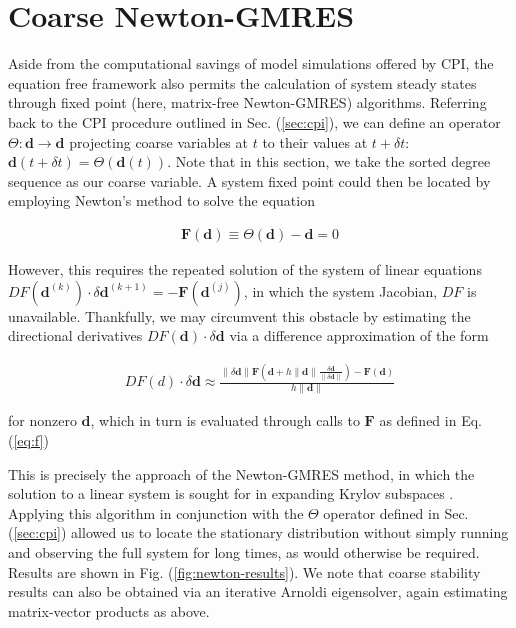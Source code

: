   \section{Coarse Newton-GMRES}
  \label{sec:ng}
  Aside from the computational savings of model simulations offered by
  CPI, the equation free framework also permits the calculation of
  system steady states through fixed point (here, matrix-free
  Newton-GMRES) algorithms.
  Referring back to the CPI procedure outlined in
  Sec. (\ref{sec:cpi}), we can define an operator
  $\Theta: \mathbf{d} \rightarrow \mathbf{d}$ projecting coarse
  variables at $t$ to their values at $t + \delta t$:
  $\mathbf{d}(t+\delta t) =\Theta(\mathbf{d}(t))$.
  Note that in this section, we take the sorted degree sequence as our
  coarse variable.
  A system fixed point could then be located by employing Newton's
  method to solve the equation

  \begin{align}
    \label{eq:f}
    \mathbf{F}(\mathbf{d}) \equiv \Theta(\mathbf{d}) - \mathbf{d} = 0
  \end{align}

  However, this requires the repeated solution of the system of linear
  equations
  $DF(\mathbf{d}^{(k)}) \cdot \delta \mathbf{d}^{(k+1)} =
  -\mathbf{F}(\mathbf{d}^{(j)})$, in which the system Jacobian, $DF$
  is unavailable.
  Thankfully, we may circumvent this obstacle by estimating the
  directional derivatives $DF(\mathbf{d}) \cdot \delta \mathbf{d}$ via
  a difference approximation of the form

  \begin{align}
    DF(d) \cdot \delta \mathbf{d} \approx \frac{\| \delta \mathbf{d} \| \mathbf{F}(\mathbf{d} + h \| \mathbf{d} \| \frac{\delta \mathbf{d}}{\| \delta \mathbf{d} \|}) - \mathbf{F}(\mathbf{d})}{h \| \mathbf{d} \|}
  \end{align}

  \noindent for nonzero $\mathbf{d}$, which in turn is evaluated
  through calls to $\mathbf{F}$ as defined in Eq. (\ref{eq:f})

  This is precisely the approach of the Newton-GMRES method, in which
  the solution to a linear system is sought for in expanding Krylov
  subspaces \cite{kelley_solving_2003}.
  Applying this algorithm in conjunction with the $\Theta$ operator
  defined in Sec. (\ref{sec:cpi}) allowed us to locate the stationary
  distribution without simply running and observing the full system
  for long times, as would otherwise be required.
  Results are shown in Fig. (\ref{fig:newton-results}).
  We note that coarse stability results can also be obtained via an
  iterative Arnoldi eigensolver, again estimating matrix-vector
  products as above.

